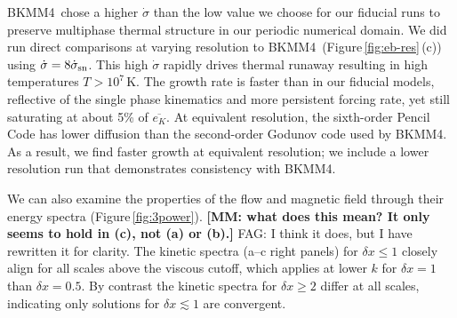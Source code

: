\documentclass[preprint2]{aastex63}
\newcommand\SNr{\dot\sigma_{\rm sn}}
\newcommand\kpc{~ {\rm kpc}}
\newcommand\dx{ {\delta x}}
\newcommand\BKM{{\sf BKMM4}}
\newcommand{\fg}[1]{\textcolor{midgreen}{#1}}
\newcommand{\mm}[1]{\textcolor{mypurple}{#1}}
\newcommand{\fag}[1]{\textcolor{midblue}{FAG: #1}}
\begin{document}
 \mm{\BKM\ chose a higher $\dot\sigma$ than the low value we choose for
   our fiducial runs}
 \fg{
   to preserve multiphase \mm{thermal} structure in \mm{our} 
   \mm{periodic} numerical domain. 
   \mm{We did run direct comparisons at varying resolution to \BKM\ (Figure\,\ref{fig:eb-res}\,(c))}
     using $\dot\sigma=8\SNr$.
\mm{This high $\dot\sigma$ rapidly drives thermal runaway resulting in high temperatures $T>10^7$\,K.}
The growth rate is faster \mm{than in our fiducial models},
reflective of the single phase kinematics and more persistent forcing
rate, yet \mm{still} saturating
 at about 5\% of $\overline{e_K}$.
\mm{At equivalent resolution, the sixth-order Pencil Code has lower
  diffusion than the second-order Godunov code used by \BKM. As a
  result, we find faster growth at equivalent resolution; we}
  include a lower resolution run \mm{that} demonstrate\mm{s} consistency with
  \BKM.} 

 \fg{We can also examine the properties of the flow and magnetic field through
 their energy spectra (Figure\,\ref{fig:3power}).
 \mm{\bf [MM: what does this mean? It only seems to hold in (c), not
   (a) or (b).]} \fag{I think it does, but I have rewritten it for clarity.}
 The kinetic spectra (a--c right panels) for $\dx\leq1$ closely align 
 for all scales above the viscous cutoff, which applies at lower $k$ for
 $\dx=1$ than $\dx=0.5$.
 By contrast the kinetic spectra for $\dx\geq2$ differ at all scales, 
 indicating only solutions for $\dx\lesssim1$ are convergent.}
\end{document}
